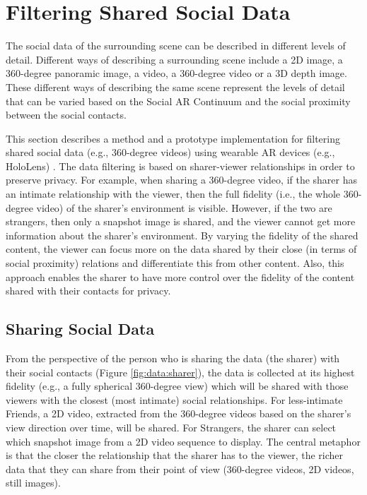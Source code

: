 \section{Filtering Shared Social Data}
\label{sec:surrounding:360}

The social data of the surrounding scene can be described in different levels of detail. Different ways of describing a surrounding scene include a 2D image, a 360-degree panoramic image, a video, a 360-degree video or a 3D depth image. These different ways of describing the same scene represent the levels of detail that can be varied based on the Social AR Continuum and the social proximity between the social contacts. 

This section describes a method and a prototype implementation for filtering shared social data (e.g., 360-degree videos) using wearable AR devices (e.g., HoloLens) \cite{Nassani2018a}. The data filtering is based on sharer-viewer relationships in order to preserve privacy. For example, when sharing a 360-degree video, if the sharer has an intimate relationship with the viewer, then the full fidelity (i.e., the whole 360-degree video) of the sharer's environment is visible. However, if the two are strangers, then only a snapshot image is shared, and the viewer cannot get more information about the sharer's environment. By varying the fidelity of the shared content, the viewer can focus more on the data shared by their close (in terms of social proximity) relations and differentiate this from other content. Also, this approach enables the sharer to have more control over the fidelity of the content shared with their contacts for privacy.



\subsection{Sharing Social Data}

From the perspective of the person who is sharing the data (the sharer) with their social contacts (Figure \ref{fig:data:sharer}), the data is collected at its highest fidelity (e.g., a fully spherical 360-degree view) which will be shared with those viewers with the closest (most intimate) social relationships. For less-intimate Friends, a 2D video, extracted from the 360-degree videos based on the sharer's view direction over time, will be shared. For Strangers, the sharer can select which snapshot image from a 2D video sequence to display. The central metaphor is that the closer the relationship that the sharer has to the viewer, the richer data that they can share from their point of view (360-degree videos, 2D videos, still images).

